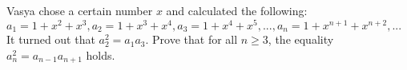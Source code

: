 Vasya chose a certain number $x$ and calculated the following:
$a_1=1+x^2+x^3, a_2=1+x^3+x^4, a_3=1+x^4+x^5, ..., a_n=1+x^{n+1}+x^{n+2} ,...$
It turned out that $a_2^2 = a_1a_3$.
Prove that for all $n\ge 3$, the equality $a_n^2 = a_{n-1}a_{n+1}$ holds.